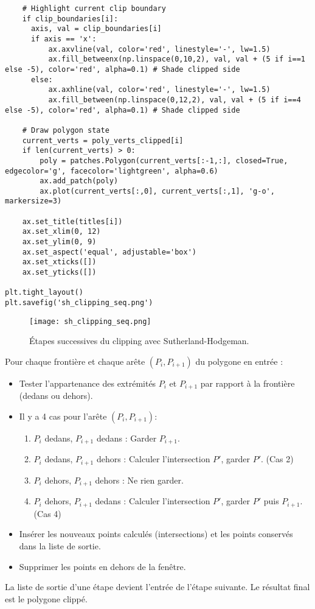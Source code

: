 \documentclass{article}
\begin{document}
{\begin{verbatim}
    # Highlight current clip boundary
    if clip_boundaries[i]:
      axis, val = clip_boundaries[i]
      if axis == 'x':
          ax.axvline(val, color='red', linestyle='-', lw=1.5)
          ax.fill_betweenx(np.linspace(0,10,2), val, val + (5 if i==1 else -5), color='red', alpha=0.1) # Shade clipped side
      else:
          ax.axhline(val, color='red', linestyle='-', lw=1.5)
          ax.fill_between(np.linspace(0,12,2), val, val + (5 if i==4 else -5), color='red', alpha=0.1) # Shade clipped side

    # Draw polygon state
    current_verts = poly_verts_clipped[i]
    if len(current_verts) > 0:
        poly = patches.Polygon(current_verts[:-1,:], closed=True, edgecolor='g', facecolor='lightgreen', alpha=0.6)
        ax.add_patch(poly)
        ax.plot(current_verts[:,0], current_verts[:,1], 'g-o', markersize=3)

    ax.set_title(titles[i])
    ax.set_xlim(0, 12)
    ax.set_ylim(0, 9)
    ax.set_aspect('equal', adjustable='box')
    ax.set_xticks([])
    ax.set_yticks([])

plt.tight_layout()
plt.savefig('sh_clipping_seq.png')
\end{verbatim}

\begin{figure}[H]
\centering
\texttt{[image: sh\_clipping\_seq.png]}
\caption{Étapes successives du clipping avec Sutherland-Hodgeman.}
\label{fig:sh_clipping_seq}
\end{figure}

Pour chaque frontière et chaque arête $(P_i, P_{i+1})$ du polygone en entrée :
\begin{itemize}
    \item Tester l'appartenance des extrémités $P_i$ et $P_{i+1}$ par rapport à la frontière (dedans ou dehors).
    \item Il y a 4 cas pour l'arête $(P_i, P_{i+1})$:
    \begin{enumerate}
        \item $P_i$ dedans, $P_{i+1}$ dedans : Garder $P_{i+1}$.
        \item $P_i$ dedans, $P_{i+1}$ dehors : Calculer l'intersection $P'$, garder $P'$. (Cas 2)
        \item $P_i$ dehors, $P_{i+1}$ dehors : Ne rien garder.
        \item $P_i$ dehors, $P_{i+1}$ dedans : Calculer l'intersection $P'$, garder $P'$ puis $P_{i+1}$. (Cas 4)
    \end{enumerate}
    \item Insérer les nouveaux points calculés (intersections) et les points conservés dans la liste de sortie.
    \item Supprimer les points en dehors de la fenêtre.
\end{itemize}
La liste de sortie d'une étape devient l'entrée de l'étape suivante. Le résultat final est le polygone clippé.

}
\end{document}
